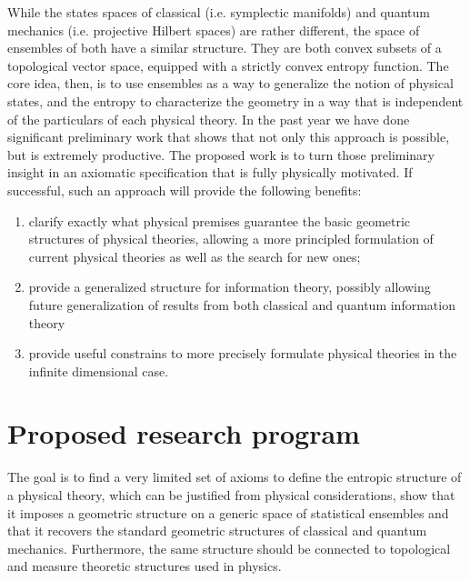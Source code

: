 While the states spaces of classical (i.e. symplectic manifolds) and quantum mechanics (i.e. projective Hilbert spaces) are rather different, the space of ensembles of both have a similar structure. They are both convex subsets of a topological vector space, equipped with a strictly convex entropy function. The core idea, then, is to use ensembles as a way to generalize the notion of physical states, and the entropy to characterize the geometry in a way that is independent of the particulars of each physical theory. In the past year we have done significant preliminary work that shows that not only this approach is possible, but is extremely productive. The proposed work is to turn those preliminary insight in an axiomatic specification that is fully physically motivated. If successful, such an approach will provide the following benefits:
\begin{enumerate}
	\item clarify exactly what physical premises guarantee the basic geometric structures of physical theories, allowing a more principled formulation of current physical theories as well as the search for new ones;
	\item provide a generalized structure for information theory, possibly allowing future generalization of results from both classical and quantum information theory
	\item provide useful constrains to more precisely formulate physical theories in the infinite dimensional case.
\end{enumerate}

\section{Proposed research program}

The goal is to find a very limited set of axioms to define the entropic structure of a physical theory, which can be justified from physical considerations, show that it imposes a geometric structure on a generic space of statistical ensembles and that it recovers the standard geometric structures of classical and quantum mechanics. Furthermore, the same structure should be connected to topological and measure theoretic structures used in physics.

 
